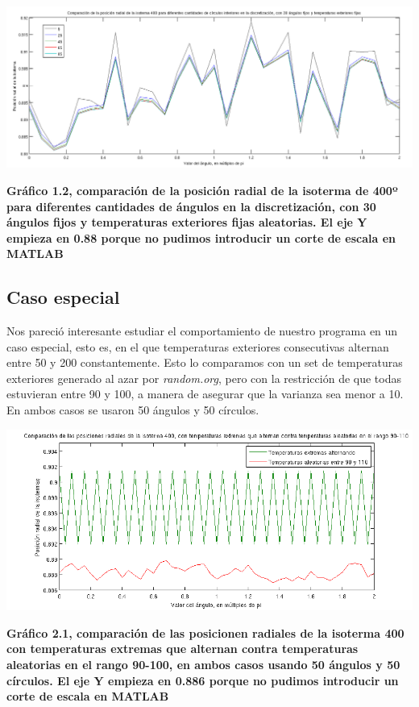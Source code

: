 \vspace{2cm}

\begin{center}
\includegraphics[scale=0.45]{../img/correccion-30ang.png}

\scriptsize{\textsf{\textbf{Gr\'afico 1.2, comparación de la posición radial de la isoterma de 400º para diferentes cantidades de ángulos en la discretización, con 30 ángulos fijos y temperaturas exteriores fijas aleatorias. El eje Y empieza en 0.88 porque no pudimos introducir un corte de escala en MATLAB}}}
\end{center}

\vspace{2cm}

\subsection{Caso especial}

Nos pareció interesante estudiar el comportamiento de nuestro programa en un caso especial, esto es, en el que temperaturas exteriores consecutivas alternan entre 50 y 200 constantemente. Esto lo comparamos con un set de temperaturas exteriores generado al azar por \textit{random.org}, pero con la restricción de que todas estuvieran entre 90 y 100, a manera de asegurar que la varianza sea menor a 10. En ambos casos se usaron 50 ángulos y 50 círculos.

\vspace{2cm}

\begin{center}
\includegraphics[scale=0.6]{../img/correccion-extremas.png}

\scriptsize{\textsf{\textbf{Gr\'afico 2.1, comparación de las posicionen radiales de la isoterma 400 con temperaturas extremas que alternan contra temperaturas aleatorias en el rango 90-100, en ambos casos usando 50 ángulos y 50 círculos. El eje Y empieza en 0.886 porque no pudimos introducir un corte de escala en MATLAB}}}
\end{center}
\vspace{2cm}

